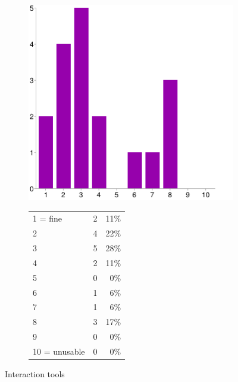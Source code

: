 \documentclass[MSc,paper=a4,pagesize=auto]{icldt}
\begin{document}
\begin{figure}[htbp!]
\centering
\begin{subfigure}{0.4\textwidth}
    \centering
    \includegraphics[width=1\linewidth]{resources/12-interaction_tools}
\end{subfigure}%
\centering
\begin{subfigure}{\textwidth}
    \centering
   	\begin{tabular}{ l c r }
1 = fine&2&11\% \\
2&4&22\% \\
3&5&28\% \\
4&2&11\% \\
5&0&0\% \\
6&1&6\% \\
7&1&6\% \\
8&3&17\% \\
9&0&0\% \\
10 = unusable&0&0\% \\
\end{tabular}
\end{subfigure} 
    \caption{Interaction tools}
    \label{fig:12-interaction_tools}
\end{figure}
\end{document}
